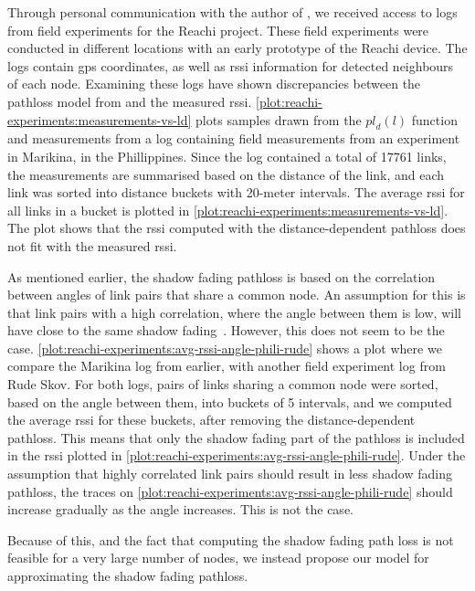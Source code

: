 Through personal communication with the author of \cite{paper:linkmodel}, we received access to logs from
field experiments for the Reachi project. These field experiments were conducted in different locations with
an early prototype of the Reachi device. The logs contain \gls{gps} coordinates, as well as \gls{rssi}
information for detected neighbours of each node. Examining these logs have shown discrepancies between the
\gls{pathloss} model from \cite{paper:linkmodel} and the measured \gls{rssi}.
\autoref{plot:reachi-experiments:measurements-vs-ld} plots samples drawn from the $\mathit{pl}_d(l)$ function
and measurements from a log containing field measurements from an experiment in Marikina, in the Phillippines.
Since the log contained a total of 17761 links, the measurements are summarised based on the distance of the
link, and each link was sorted into distance buckets with 20-meter intervals. The average \gls{rssi} for all
links in a bucket is plotted in \autoref{plot:reachi-experiments:measurements-vs-ld}. The plot shows that the
\gls{rssi} computed with the distance-dependent \gls{pathloss} does not fit with the measured \gls{rssi}.
\medbreak

As mentioned earlier, the shadow fading \gls{pathloss} is based on the correlation between angles of link
pairs that share a common node. An assumption for this is that link pairs with a high correlation, where the
angle between them is low, will have close to the same shadow fading~\cite{paper:linkmodel}. However, this
does not seem to be the case. \autoref{plot:reachi-experiments:avg-rssi-angle-phili-rude} shows a plot where we
compare the Marikina log from earlier, with another field experiment log from Rude Skov. For both logs, pairs
of links sharing a common node were sorted, based on the angle between them, into buckets of 5 \degree
intervals, and we computed the average \gls{rssi} for these buckets, after removing the distance-dependent
\gls{pathloss}. This means that only the shadow fading part of the \gls{pathloss} is included in the
\gls{rssi} plotted in \autoref{plot:reachi-experiments:avg-rssi-angle-phili-rude}. Under the assumption that
highly correlated link pairs should result in less shadow fading \gls{pathloss}, the traces on
\autoref{plot:reachi-experiments:avg-rssi-angle-phili-rude} should increase gradually as the angle increases.
This is not the case. \medbreak

Because of this, and the fact that computing the shadow fading path loss is not feasible for a very large
number of nodes, we instead propose our model for approximating the shadow fading \gls{pathloss}.

